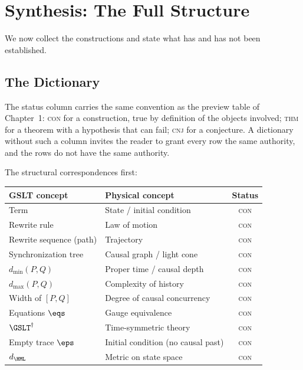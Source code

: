 \chapter{Synthesis: The Full Structure}
\label{sec:synthesis}

We now collect the constructions and state what has and has not been
established.

\section{The Dictionary}

The status column carries the same convention as the preview table of
Chapter~1: \textsc{con} for a construction, true by definition of the
objects involved; \textsc{thm} for a theorem with a hypothesis that can
fail; \textsc{cnj} for a conjecture.  A dictionary without such a column
invites the reader to grant every row the same authority, and the rows do
not have the same authority.

The structural correspondences first:

\begin{center}
\renewcommand{\arraystretch}{1.3}
\begin{tabular}{p{4.9cm} p{5.6cm} c}
\toprule
\textbf{GSLT concept} & \textbf{Physical concept} & \textbf{Status} \\
\midrule
Term & State / initial condition & \textsc{con} \\
Rewrite rule & Law of motion & \textsc{con} \\
Rewrite sequence (path) & Trajectory & \textsc{con} \\
Synchronization tree & Causal graph / light cone & \textsc{con} \\
$d_{\min}(P,Q)$ & Proper time / causal depth & \textsc{con} \\
$d_{\max}(P,Q)$ & Complexity of history & \textsc{con} \\
Width of $[P,Q]$ & Degree of causal concurrency & \textsc{con} \\
Equations $\eqs$ & Gauge equivalence & \textsc{con} \\
$\GSLT^\dagger$ & Time-symmetric theory & \textsc{con} \\
Empty trace $\eps$ & Initial condition (no causal past) & \textsc{con} \\
$d_{\HML}$ & Metric on state space & \textsc{con} \\
\bottomrule
\end{tabular}
\end{center}

